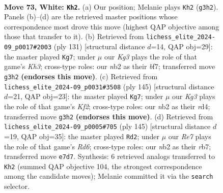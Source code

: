 \documentclass[11pt]{article}
\begin{document}
\clearpage

\begin{figure}[p]\centering
\begin{subfigure}{0.46\textwidth}\centering
\resizebox{\linewidth}{!}{%
\newchessgame
\chessboard[
  setfen={8/1p2R2p/1k4pP/5p2/p4P2/6K1/1n6/8 w - - 2 73},
  showmover=false,
  pgfstyle=straightmove, color=movearrow, markmove={g3-h2}
]}
\caption{}
\end{subfigure}\hfill
\begin{subfigure}{0.46\textwidth}\centering
\resizebox{\linewidth}{!}{%
\newchessgame
\chessboard[
  setfen={8/5B2/5p1k/p7/P3P2P/1P1r2P1/5K2/8 b - - 22 66},
  showmover=false,
  pgfstyle=straightmove, color=movearrow, markmove={h6-g7}
]}
\caption{}
\end{subfigure}
\\[4pt]
\begin{subfigure}{0.46\textwidth}\centering
\resizebox{\linewidth}{!}{%
\newchessgame
\chessboard[
  setfen={8/5k2/5p1p/5P1P/3R2P1/5K2/8/6r1 b - - 56 73},
  showmover=false,
  pgfstyle=straightmove, color=movearrow, markmove={f7-g7}
]}
\caption{}
\end{subfigure}\hfill
\begin{subfigure}{0.46\textwidth}\centering
\resizebox{\linewidth}{!}{%
\newchessgame
\chessboard[
  setfen={8/1R6/8/4kpp1/p7/P2r3P/1P3P1K/8 b - - 70 73},
  showmover=false,
  pgfstyle=straightmove, color=movearrow, markmove={d3-d2}
]}
\caption{}
\end{subfigure}
\caption{\textbf{Move 73, White: \texttt{Kh2}.} (a) Our position; Melanie plays \texttt{Kh2} (\texttt{g3h2}). Panels (b)--(d) are the retrieved master positions whose correspondence most drove this move (highest QAP objective among those that transfer to it). (b) Retrieved from \texttt{lichess\_elite\_2024-09\_p0017\#2003} (ply 131) [structural distance $d$=14, QAP obj=29]: the master played \texttt{Kg7}; under $\mu$ our \emph{Kg3} plays the role of that game's \emph{Kh3}; cross-type roles: our \emph{n}b2 as their \emph{b}f7; transferred move \texttt{g3h2} \textbf{(endorses this move)}. (c) Retrieved from \texttt{lichess\_elite\_2024-09\_p0031\#3508} (ply 145) [structural distance $d$=21, QAP obj=23]: the master played \texttt{Kg7}; under $\mu$ our \emph{Kg3} plays the role of that game's \emph{Kf2}; cross-type roles: our \emph{n}b2 as their \emph{r}d4; transferred move \texttt{g3h2} \textbf{(endorses this move)}. (d) Retrieved from \texttt{lichess\_elite\_2024-09\_p0005\#705} (ply 145) [structural distance $d$=19, QAP obj=35]: the master played \texttt{Rd2}; under $\mu$ our \emph{Re7} plays the role of that game's \emph{Rd6}; cross-type roles: our \emph{n}b2 as their \emph{r}b7; transferred move \texttt{e7d7}. Synthesis: 6 retrieved analogs transferred to \texttt{Kh2} (summed QAP objective 104, the strongest correspondence among the candidate moves); Melanie committed it via the \texttt{search} selector.}
\label{fig:thought-m144}
\end{figure}
\end{document}

